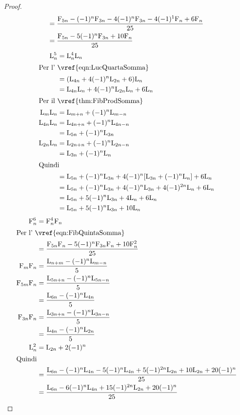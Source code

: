 \begin{proof}
\begin{align*}
	={}&\dfrac{\mathrm{F}_{5n}-(-1)^{n}\mathrm{F}_{3n}-4(-1)^n\mathrm{F}_{3n}-4(-1)^{1}\mathrm{F}_{n}+6\mathrm{F}_{n}}{25}\\
	={}&\dfrac{\mathrm{F}_{5n}-5(-1)^n\mathrm{F}_{3n}+10\mathrm{F}_{n}}{25}\\
\end{align*}
\begin{align*}
	\Luc{n}^5={}&\Luc{n}^4\Luc{n}\\
	\intertext{Per l'~\vref{eqn:LucQuartaSomma}}
	={}&(\Luc{4n}+4(-1)^n\Luc{2n}+6)\Luc{n}\\
	={}&\Luc{4n}\Luc{n}+4(-1)^n\Luc{2n}\Luc{n}+6\Luc{n}\\
	\intertext{Per il~\vref{thm:FibProdSomma}}
	\Luc{m}\Luc{n}={}&\Luc{m+n}+(-1)^{n}\Luc{m-n}\\
	\Luc{4n}\Luc{n}={}&\Luc{4n+n}+(-1)^{n}\Luc{4n-n}\\
	={}&\Luc{5n}+(-1)^{n}\Luc{3n}\\
	\Luc{2n}\Luc{n}={}&\Luc{2n+n}+(-1)^{n}\Luc{2n-n}\\
	={}&\Luc{3n}+(-1)^{n}\Luc{n}\\
	\intertext{Quindi}
	={}&\Luc{5n}+(-1)^{n}\Luc{3n}+4(-1)^n[\Luc{3n}+(-1)^{n}\Luc{n}]+6\Luc{n}\\
	={}&\Luc{5n}+(-1)^{n}\Luc{3n}+4(-1)^n\Luc{3n}+4(-1)^{2n}\Luc{n}+6\Luc{n}\\
	={}&\Luc{5n}+5(-1)^n\Luc{3n}+4\Luc{n}+6\Luc{n}\\
	={}&\Luc{5n}+5(-1)^n\Luc{3n}+10\Luc{n}\\
\end{align*}
\begin{align*}
	\Fib{n}^6={}&\Fib{n}^4\Fib{n}\\
	\intertext{Per l'~\vref{eqn:FibQuintaSomma}}
	={}&\dfrac{\Fib{5n}\Fib{n}-5(-1)^n\Fib{3n}\Fib{n}+10\Fib{n}^2}{25}\\
	\Fib{m}\Fib{n}={}&\dfrac{\Luc{n+m}-(-1)^n\Luc{m-n}}{5}\\
	\Fib{5m}\Fib{n}={}&\dfrac{\Luc{5n+n}-(-1)^n\Luc{5n-n}}{5}\\
	={}&\dfrac{\Luc{6n}-(-1)^n\Luc{4n}}{5}\\
	\Fib{3n}\Fib{n}={}&\dfrac{\Luc{3n+n}-(-1)^n\Luc{3n-n}}{5}\\
	={}&\dfrac{\Luc{4n}-(-1)^n\Luc{2n}}{5}\\
	\Luc{n}^2={}&\Luc{2n}+2(-1)^n\\
	\intertext{Quindi}
	={}&\dfrac{\Luc{6n}-(-1)^n\Luc{4n}-5(-1)^n\Luc{4n}+5(-1)^{2n}\Luc{2n}+10\Luc{2n}+20(-1)^n}{25}\\
	={}&\dfrac{\Luc{6n}-6(-1)^n\Luc{4n}+15(-1)^{2n}\Luc{2n}+20(-1)^n}{25}\\

\end{align*}
\end{proof}
